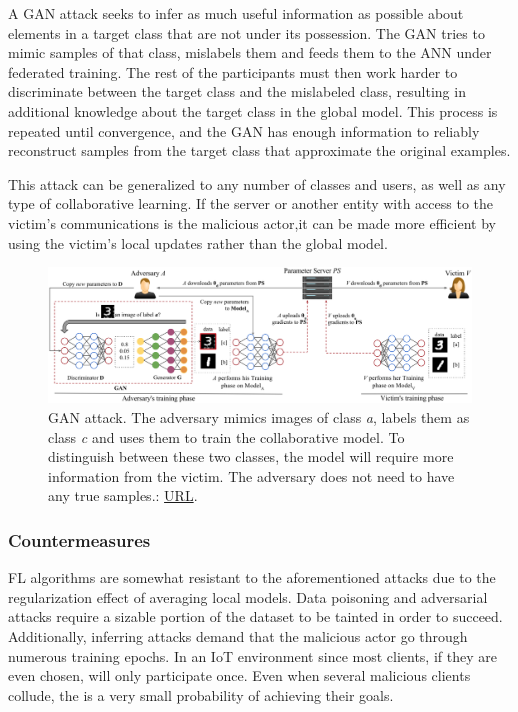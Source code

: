 \begin{itemize}
  A GAN attack seeks to infer as much useful information as possible about elements in a target class that are not under its possession. The GAN tries to mimic samples of that class, mislabels them and feeds them to the ANN under federated training. The rest of the participants must then work harder to discriminate between the target class and the mislabeled class, resulting in additional knowledge about the target class in the global model. This process is repeated until convergence, and the GAN has enough information to reliably reconstruct samples from the target class that approximate the original examples. 
  
  This attack can be generalized to any number of classes and users, as well as any type of collaborative learning. If the server or another entity with access to the victim's communications is the malicious actor,it can be made more efficient by using the victim's local updates rather than the global model.
\end{itemize}

\begin{figure}[H]
    \centering
        \includegraphics[width=1\textwidth]{Images/topologies/gan_fl.png}
        \decoRule
        \caption[GAN attack]{GAN attack. The adversary mimics images of class \emph{a}, labels them as class \emph{c} and uses them to train the collaborative model. To distinguish between these two classes, the model will require more information from the victim. The adversary does not need to have any true samples.: \href{https://arxiv.org/abs/1702.07464}{URL}.}
        \label{fig:GAN attack}
\end{figure}

\subsubsection{Countermeasures}
FL algorithms are somewhat resistant to the aforementioned attacks due to the regularization effect of averaging local models. Data poisoning and adversarial attacks require a sizable portion of the dataset to be tainted in order to succeed. Additionally, inferring attacks demand that the malicious actor go through numerous training epochs. In an IoT environment since most clients, if they are even chosen, will only participate once. Even when several malicious clients collude, the is a very small probability of achieving their goals.

